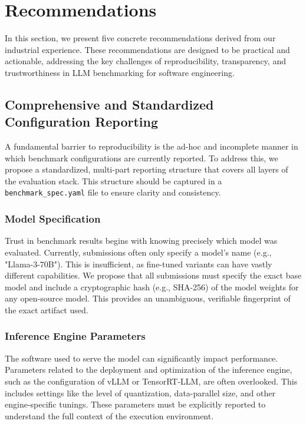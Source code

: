 \documentclass[sigconf,review]{acmart}
\begin{document}

\section{Recommendations}
\label{sec:recommendations}
In this section, we present five concrete recommendations derived from our industrial experience. These recommendations are designed to be practical and actionable, addressing the key challenges of reproducibility, transparency, and trustworthiness in LLM benchmarking for software engineering.

\subsection{Comprehensive and Standardized Configuration Reporting}
\label{sec:rec1}
A fundamental barrier to reproducibility is the ad-hoc and incomplete manner in which benchmark configurations are currently reported. To address this, we propose a standardized, multi-part reporting structure that covers all layers of the evaluation stack. This structure should be captured in a \texttt{benchmark\_spec.yaml} file to ensure clarity and consistency.

\subsubsection{Model Specification}
Trust in benchmark results begins with knowing precisely which model was evaluated. Currently, submissions often only specify a model's name (e.g., "Llama-3-70B"). This is insufficient, as fine-tuned variants can have vastly different capabilities. We propose that all submissions must specify the exact base model and include a cryptographic hash (e.g., SHA-256) of the model weights for any open-source model. This provides an unambiguous, verifiable fingerprint of the exact artifact used.


\subsubsection{Inference Engine Parameters}
The software used to serve the model can significantly impact performance. Parameters related to the deployment and optimization of the inference engine, such as the configuration of vLLM or TensorRT-LLM, are often overlooked. This includes settings like the level of quantization, data-parallel size, and other engine-specific tunings. These parameters must be explicitly reported to understand the full context of the execution environment.
\end{document}
